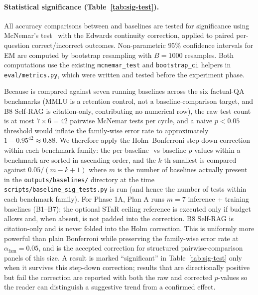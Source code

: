 \paragraph{Statistical significance (Table~\ref{tab:sig-test}).}
All accuracy comparisons between \caem{} and baselines are tested
for significance using McNemar's
test~\cite{mcnemar1947note} with the Edwards continuity correction,
applied to paired per-question correct/incorrect outcomes. Non-parametric
$95\%$ confidence intervals for EM are computed by bootstrap resampling
with $B = 1000$ resamples. Both computations use the existing
\texttt{mcnemar\_test} and \texttt{bootstrap\_ci} helpers in
\texttt{eval/metrics.py}, which were written and tested before the
experiment phase.

Because \caem{} is compared against seven running baselines across the
six factual-QA benchmarks (MMLU is a retention control, not a
baseline-comparison target, and B8 Self-RAG is citation-only, contributing
no numerical row), the raw test count is at most
$7 \times 6 = 42$ pairwise McNemar tests per cycle, and a naive
$p < 0.05$ threshold would inflate the family-wise error rate to
approximately $1 - 0.95^{42} \approx 0.88$. We therefore apply the
Holm--Bonferroni step-down correction~\cite{holm1979simple} within
each benchmark family: the per-baseline \caem{}-vs-baseline
$p$-values within a benchmark are sorted in ascending order, and
the $k$-th smallest is compared against $0.05 / (m - k + 1)$ where
$m$ is the number of baselines actually present in the
\texttt{outputs/baselines/} directory at the time
\texttt{scripts/baseline\_sig\_tests.py} is run (and hence the number
of tests within each benchmark family). For Phase 1A, Plan A runs
$m = 7$ inference + training baselines (B1--B7); the
optional STaR ceiling reference is executed only if budget allows
and, when absent, is not padded into the correction. B8 Self-RAG
is citation-only and is never folded into the Holm correction. This
is uniformly more powerful than plain Bonferroni while preserving the
family-wise error rate at $\alpha_{\text{fam}} = 0.05$, and is the
accepted correction for structured pairwise-comparison panels of
this size. A result is marked ``significant'' in
Table~\ref{tab:sig-test} only when it survives this step-down
correction; results that are directionally positive but fail the
correction are reported with both the raw and corrected $p$-values
so the reader can distinguish a suggestive trend from a confirmed
effect.

